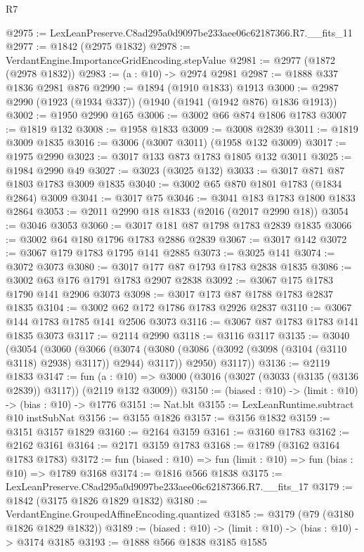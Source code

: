 \begin{lexlean}{R7}
\begin{coremodule}
@2975 := LexLeanPreserve.C8ad295a0d9097be233aee06c62187366.R7.__fits_11
@2977 := @1842 (@2975 @1832)
@2978 := VerdantEngine.ImportanceGridEncoding.stepValue
@2981 := @2977 (@1872 (@2978 @1832))
@2983 := (a : @10) -> @2974 @2981
@2987 := @1888 @337 @1836 @2981 @876
@2990 := @1894 (@1910 @1833) @1913
@3000 := @2987 @2990 (@1923 (@1934 @337)) (@1940 (@1941 (@1942 @876) @1836 @1913))
@3002 := @1950 @2990 @165
@3006 := @3002 @66 @874 @1806 @1783
@3007 := @1819 @132
@3008 := @1958 @1833
@3009 := @3008 @2839
@3011 := @1819 @3009 @1835
@3016 := @3006 (@3007 @3011) (@1958 @132 @3009)
@3017 := @1975 @2990
@3023 := @3017 @133 @873 @1783 @1805 @132 @3011
@3025 := @1984 @2990 @49
@3027 := @3023 (@3025 @132)
@3033 := @3017 @871 @87 @1803 @1783 @3009 @1835
@3040 := @3002 @65 @870 @1801 @1783 (@1834 @2864) @3009
@3041 := @3017 @75
@3046 := @3041 @183 @1783 @1800 @1833 @2864
@3053 := @2011 @2990 @18 @1833 (@2016 (@2017 @2990 @18))
@3054 := @3046 @3053
@3060 := @3017 @181 @87 @1798 @1783 @2839 @1835
@3066 := @3002 @64 @180 @1796 @1783 @2886 @2839
@3067 := @3017 @142
@3072 := @3067 @179 @1783 @1795 @141 @2885
@3073 := @3025 @141
@3074 := @3072 @3073
@3080 := @3017 @177 @87 @1793 @1783 @2838 @1835
@3086 := @3002 @63 @176 @1791 @1783 @2907 @2838
@3092 := @3067 @175 @1783 @1790 @141 @2906 @3073
@3098 := @3017 @173 @87 @1788 @1783 @2837 @1835
@3104 := @3002 @62 @172 @1786 @1783 @2926 @2837
@3110 := @3067 @144 @1783 @1785 @141 @2506 @3073
@3116 := @3067 @87 @1783 @1783 @141 @1835 @3073
@3117 := @2114 @2990
@3118 := @3116 @3117
@3135 := @3040
    (@3054
      (@3060
        (@3066
          (@3074 (@3080 (@3086 (@3092 (@3098 (@3104 (@3110 @3118) @2938) @3117)) @2944) @3117))
          @2950)
        @3117))
@3136 := @2119 @1833
@3147 := fun (a : @10) =>
  @3000 (@3016 (@3027 (@3033 (@3135 (@3136 @2839)) @3117)) (@2119 @132 @3009))
@3150 := (biased : @10) -> (limit : @10) -> (bias : @10) -> @1776
@3151 := Nat.blt
@3155 := LexLeanRuntime.subtract @10 instSubNat
@3156 := @3155 @1826
@3157 := @3156 @1832
@3159 := @3151 @3157 @1829
@3160 := @2164 @3159
@3161 := @3160 @1783
@3162 := @2162 @3161
@3164 := @2171 @3159 @1783
@3168 := @1789 (@3162 @3164 @1783 @1783)
@3172 := fun (biased : @10) => fun (limit : @10) => fun (bias : @10) => @1789 @3168
@3174 := @1816 @566 @1838
@3175 := LexLeanPreserve.C8ad295a0d9097be233aee06c62187366.R7.__fits_17
@3179 := @1842 (@3175 @1826 @1829 @1832)
@3180 := VerdantEngine.GroupedAffineEncoding.quantized
@3185 := @3179 (@79 (@3180 @1826 @1829 @1832))
@3189 := (biased : @10) -> (limit : @10) -> (bias : @10) -> @3174 @3185
@3193 := @1888 @566 @1838 @3185 @1585

\end{coremodule}
\end{lexlean}
